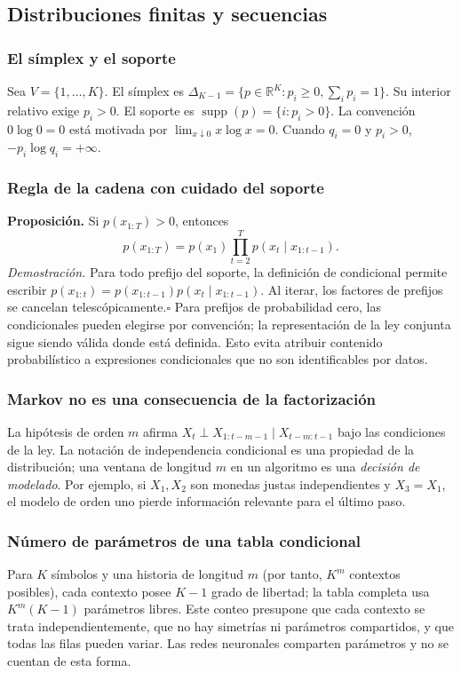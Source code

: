 \label{s01:mod:sup}
\subsection{Distribuciones finitas y secuencias}
\subsubsection{El símplex y el soporte}
Sea $V=\{1,\ldots,K\}$. El símplex es
$\Delta_{K-1}=\{p\in\mathbb R^K:p_i\ge0,\sum_i p_i=1\}$.
Su interior relativo exige $p_i>0$. El soporte es
$\operatorname{supp}(p)=\{i:p_i>0\}$. La convención
$0\log0=0$ está motivada por $\lim_{x\downarrow0}x\log x=0$.
Cuando $q_i=0$ y $p_i>0$, $-p_i\log q_i=+\infty$.
\subsubsection{Regla de la cadena con cuidado del soporte}
\textbf{Proposición.} Si $p(x_{1:T})>0$, entonces
\[p(x_{1:T})=p(x_1)\prod_{t=2}^T p(x_t\mid x_{1:t-1}).\]
\textit{Demostración.} Para todo prefijo del soporte, la definición de
condicional permite escribir
$p(x_{1:t})=p(x_{1:t-1})p(x_t\mid x_{1:t-1})$.
Al iterar, los factores de prefijos se cancelan telescópicamente.\hfill$\square$
Para prefijos de probabilidad cero, las condicionales pueden elegirse por
convención; la representación de la ley conjunta sigue siendo válida donde
está definida. Esto evita atribuir contenido probabilístico a expresiones
condicionales que no son identificables por datos.
\subsubsection{Markov no es una consecuencia de la factorización}
La hipótesis de orden $m$ afirma
$X_t\perp X_{1:t-m-1}\mid X_{t-m:t-1}$ bajo las condiciones de la ley.
La notación de independencia condicional es una propiedad de la distribución;
una ventana de longitud $m$ en un algoritmo es una \emph{decisión de modelado}.
Por ejemplo, si $X_1,X_2$ son monedas justas independientes y $X_3=X_1$,
el modelo de orden uno pierde información relevante para el último paso.
\subsubsection{Número de parámetros de una tabla condicional}
Para $K$ símbolos y una historia de longitud $m$ (por tanto, $K^m$ contextos posibles), cada contexto posee $K-1$
grado de libertad; la tabla completa usa $K^m(K-1)$ parámetros libres.
Este conteo presupone que cada contexto se trata independientemente, que no
hay simetrías ni parámetros compartidos, y que todas las filas pueden variar.
Las redes neuronales comparten parámetros y no se cuentan de esta forma.

